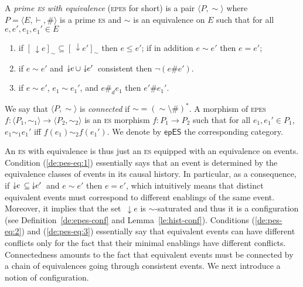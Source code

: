 \documentclass[conference]{IEEEtran}
\newcommand{\esabbr}{\textsc{es}}
\newcommand{\eseqabbr}{\textsc{epes}}
\newcommand{\eqclass}[2][]{\ensuremath{[{#2}]_{\scriptscriptstyle {#1}}}}
\newcommand{\epes}{\ensuremath{\mathsf{epES}}}
\newcommand\twoheaddownarrow{\mathrel{\raisebox{0.8\depth}{\rotatebox{270}{$\twoheadrightarrow$}}}}
\newcommand{\scauses}[1]{\ensuremath{\twoheaddownarrow\!\!{#1}\,}}
\newcommand{\causes}[1]{\ensuremath{\,\downarrow\!\!{#1}}}
\begin{document}
\begin{definition}
  \label{de:pes-eq}
  A \emph{prime {\esabbr} with equivalence} ({\eseqabbr} for short) is
  a pair $\langle P, \sim \rangle$ where
  $P = \langle E, \vdash, \# \rangle$ is a prime {\esabbr} and $\sim$
  is an equivalence on $E$ such that for all $e, e', e_1, e_1' \in E$
  \begin{enumerate}
    
  \item
    \label{de:pes-eq:1}
    if
    $\eqclass[\sim]{\causes{e}} \subseteq \eqclass[\sim]{\causes{e'}}$
    then $e \leq e'$; if in addition $e \sim e'$ then $e=e'$;

  \item
    \label{de:pes-eq:2}
    if $e \sim e'$ and $\scauses{e} \cup \scauses{e'}$ consistent then
    $\neg (e \# e')$.
  
  \item
    \label{de:pes-eq:3}
    if $e \sim e'$, $e_1 \sim e_1'$, and $e \#_d e_1$ then $e' \# e_1'$.
  \end{enumerate}
  We say that $\langle P, \sim \rangle$ is {\emph{connected}}
  if ${\sim} = (\sim \setminus \#)^*$. A morphism of {\eseqabbr}
  $f : \langle P_1, \sim_1 \rangle \to \langle P_{{2}}, \sim_2 \rangle$ is
  an {\esabbr} morphism $f : P_1 \to P_2$ such that for all
  $e_1, e_1' \in P_1$, $e_1 \sim_1 e_1'$ iff
  $f(e_1) \sim_2 f(e_1')$. We denote by $\epes$ the corresponding
  category.
\end{definition}

An {\esabbr} with equivalence is thus just an {\esabbr} equipped with
an equivalence on events. Condition (\ref{de:pes-eq:1}) essentially
says that an event is determined by the equivalence classes of events
in its causal history. In particular, as a consequence, if
$\scauses{e} \subseteq\, \scauses{e'}$ and $e \sim e'$ then $e=e'$,
which intuitively means that distinct equivalent events must
correspond to different enablings of the same event. Moreover, it
implies that the set $\causes{e}$ is $\sim$-saturated and thus it is a
configuration (see Definition~\ref{de:epes-conf} and
Lemma~\ref{le:hist-conf}).
%
Conditions (\ref{de:pes-eq:2}) and (\ref{de:pes-eq:3}) essentially say that equivalent events can have different conflicts only for the fact that their minimal enablings have different conflicts.
%
Connectedness 
amounts to the fact that equivalent events must be connected by a 
chain of equivalences going through consistent events. 
%
We next introduce a notion of configuration.
 
\end{document}
